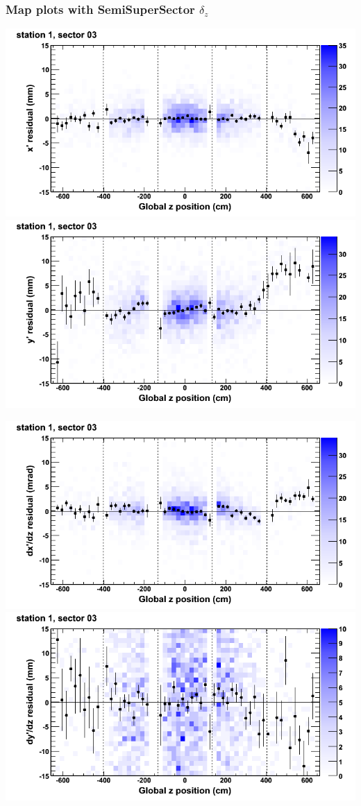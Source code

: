 \documentclass[compress]{beamer}
\begin{document}
\begin{frame}
\frametitle{Map plots with SemiSuperSector $\delta_z$}
\includegraphics[width=0.5\linewidth]{zfit_mapplots/DTvsz_st1sec03_x.png}
\includegraphics[width=0.5\linewidth]{zfit_mapplots/DTvsz_st1sec03_y.png}

\includegraphics[width=0.5\linewidth]{zfit_mapplots/DTvsz_st1sec03_dxdz.png}
\includegraphics[width=0.5\linewidth]{zfit_mapplots/DTvsz_st1sec03_dydz.png}
\end{frame}
\end{document}
